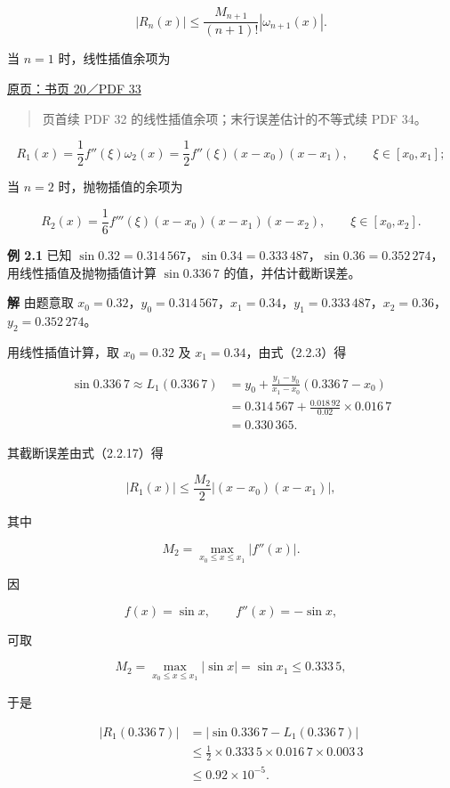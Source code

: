 \documentclass[
  10pt,
  fontset=fandol]{ctexart}
\begin{document}
\[
|R_n(x)|\le\frac{M_{n+1}}{(n+1)!}|\omega_{n+1}(x)|.
\tag{2.2.16}
\]

当 \(n=1\) 时，线性插值余项为

\href{../../source-images/pdf-033.jpeg}{原页：书页 20／PDF 33}

\begin{quote}
页首续 PDF 32 的线性插值余项；末行误差估计的不等式续 PDF 34。
\end{quote}

\[
R_1(x)=\frac12 f''(\xi)\omega_2(x)
=\frac12 f''(\xi)(x-x_0)(x-x_1),
\qquad \xi\in[x_0,x_1];
\tag{2.2.17}
\]

当 \(n=2\) 时，抛物插值的余项为

\[
R_2(x)=\frac16 f'''(\xi)(x-x_0)(x-x_1)(x-x_2),
\qquad \xi\in[x_0,x_2].
\tag{2.2.18}
\]

\textbf{例 2.1} 已知 \(\sin0.32=0.314\,567\)，\(\sin0.34=0.333\,487\)，\(\sin0.36=0.352\,274\)，用线性插值及抛物插值计算 \(\sin0.336\,7\) 的值，并估计截断误差。

\textbf{解} 由题意取 \(x_0=0.32\)，\(y_0=0.314\,567\)，\(x_1=0.34\)，\(y_1=0.333\,487\)，\(x_2=0.36\)，\(y_2=0.352\,274\)。

用线性插值计算，取 \(x_0=0.32\) 及 \(x_1=0.34\)，由式（2.2.3）得

\[
\begin{aligned}
\sin0.336\,7\approx L_1(0.336\,7)
&=y_0+\frac{y_1-y_0}{x_1-x_0}(0.336\,7-x_0)\\
&=0.314\,567+\frac{0.018\,92}{0.02}\times0.016\,7\\
&=0.330\,365.
\end{aligned}
\]

其截断误差由式（2.2.17）得

\[
|R_1(x)|\le\frac{M_2}{2}|(x-x_0)(x-x_1)|,
\]

其中

\[
M_2=\max_{x_0\le x\le x_1}|f''(x)|.
\]

因

\[
f(x)=\sin x,\qquad f''(x)=-\sin x,
\]

可取

\[
M_2=\max_{x_0\le x\le x_1}|\sin x|=\sin x_1\le0.333\,5,
\]

于是

\[
\begin{aligned}
|R_1(0.336\,7)|
&=|\sin0.336\,7-L_1(0.336\,7)|\\
&\le\frac12\times0.333\,5\times0.016\,7\times0.003\,3\\
&\le0.92\times10^{-5}.
\end{aligned}
\]
\end{document}
